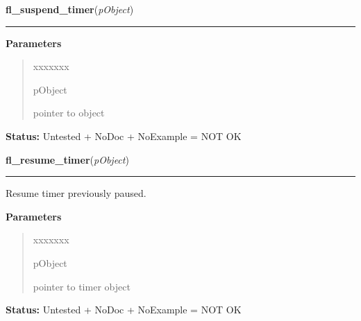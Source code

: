 \hspace{.8\funcindent}\begin{boxedminipage}{\funcwidth}

    \raggedright \textbf{fl\_suspend\_timer}(\textit{pObject})

    \vspace{-1.5ex}

    \rule{\textwidth}{0.5\fboxrule}
\setlength{\parskip}{2ex}
\setlength{\parskip}{1ex}
      \textbf{Parameters}
      \vspace{-1ex}

      \begin{quote}
        \begin{Ventry}{xxxxxxx}

          \item[pObject]

          pointer to object

        \end{Ventry}

      \end{quote}

\textbf{Status:} Untested + NoDoc + NoExample = NOT OK



    \end{boxedminipage}

    \label{xformslib:library:fl_resume_timer}

    \vspace{0.5ex}

\hspace{.8\funcindent}\begin{boxedminipage}{\funcwidth}

    \raggedright \textbf{fl\_resume\_timer}(\textit{pObject})

    \vspace{-1.5ex}

    \rule{\textwidth}{0.5\fboxrule}
\setlength{\parskip}{2ex}
    Resume timer previously paused.

\setlength{\parskip}{1ex}
      \textbf{Parameters}
      \vspace{-1ex}

      \begin{quote}
        \begin{Ventry}{xxxxxxx}

          \item[pObject]

          pointer to timer object

        \end{Ventry}

      \end{quote}

\textbf{Status:} Untested + NoDoc + NoExample = NOT OK



    \end{boxedminipage}

